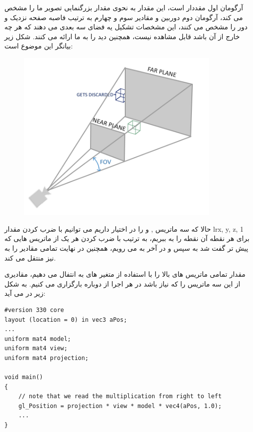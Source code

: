 \documentclass[a4paper, 12pt]{book}
\newcommand{\lrit}[1]{\lr{\textit{#1}}}
\begin{document}
    آرگومان اول مقددار  است، این مقدار به نحوی مقدار بزرگنمایی تصویر ما را مشخص می کند، آرگومان دوم  دوربین و مقادیر سوم و چهارم به ترتیب فاصبه صفحه نزدیک و دور را مشخص می کنند، این مشخصات تشکیل یه فضای سه بعدی می دهند که هر چه خارج از آن باشد قابل مشاهده نیست، همچنین دید  را به ما ارائه می کنند.
    شکل زیر بیانگر این موضوع است:

\begin{figure}[ht]
    \centering
    \href{https://learnopengl.com}{
        \includegraphics[width=10cm]{images/perspective_frustum.png}
    }
    \caption{}
    \label{fig:my_label}
\end{figure}

    حالا که سه ماتریس ,  و  را در اختیار داریم می توانیم با ضرب کردن مقدار lr{x, y, z, 1} برای هر نقطه آن نقطه را به  ببریم، به ترتیب با ضرب کردن هر یک از ماتریس هایی که پیش تر گفت شد به  سپس  و در آخر به  می رویم، همچنین  در نهایت تمامی مقادیر را به  نیز منتقل می کند.\par
    مقدار تمامی ماتریس های بالا را با استفاده از متغیر های  به  انتفال می دهیم، مقادیری از این سه ماتریس را که نیاز باشد در هر اجرا از  دوباره بارگزاری می کنیم. به شکل زیر در می آید:
    \newpage
    \begin{LTR}
    \small
        \begin{lstlisting}[style=C++Style,caption=\lrit{going 3D}]
#version 330 core
layout (location = 0) in vec3 aPos;
...
uniform mat4 model;
uniform mat4 view;
uniform mat4 projection;

void main()
{
    // note that we read the multiplication from right to left
    gl_Position = projection * view * model * vec4(aPos, 1.0);
    ...
}
        \end{lstlisting}
    \end{LTR}
    \normalsize
    \vspace*{0.3cm}
    
\end{document}
